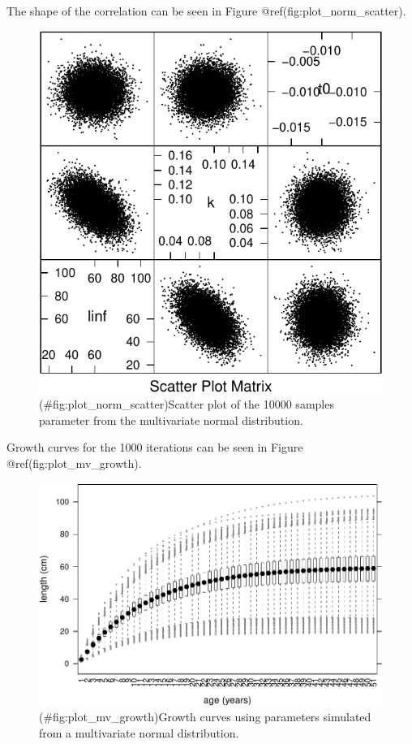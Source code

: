 \documentclass[
]{book}
\begin{document}
The shape of the correlation can be seen in Figure @ref(fig:plot\_norm\_scatter).

\begin{figure}
\centering
\includegraphics{_main_files/figure-latex/plot_norm_scatter-1.pdf}
\caption{(\#fig:plot\_norm\_scatter)Scatter plot of the 10000 samples parameter from the multivariate normal distribution.}
\end{figure}

Growth curves for the 1000 iterations can be seen in Figure @ref(fig:plot\_mv\_growth).

\begin{figure}
\centering
\includegraphics{_main_files/figure-latex/plot_mv_growth-1.pdf}
\caption{(\#fig:plot\_mv\_growth)Growth curves using parameters simulated from a multivariate normal distribution.}
\end{figure}
\end{document}
